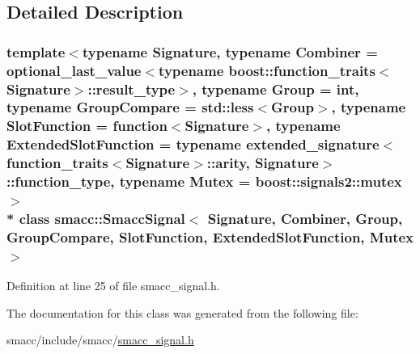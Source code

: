 \subsection{Detailed Description}
\subsubsection*{template$<$typename Signature, typename Combiner = optional\+\_\+last\+\_\+value$<$typename boost\+::function\+\_\+traits$<$\+Signature$>$\+::result\+\_\+type$>$, typename Group = int, typename Group\+Compare = std\+::less$<$\+Group$>$, typename Slot\+Function = function$<$\+Signature$>$, typename Extended\+Slot\+Function = typename extended\+\_\+signature$<$function\+\_\+traits$<$\+Signature$>$\+::arity, Signature$>$\+::function\+\_\+type, typename Mutex = boost\+::signals2\+::mutex$>$\\*
class smacc\+::\+Smacc\+Signal$<$ Signature, Combiner, Group, Group\+Compare, Slot\+Function, Extended\+Slot\+Function, Mutex $>$}



Definition at line 25 of file smacc\+\_\+signal.\+h.



The documentation for this class was generated from the following file\+:\begin{DoxyCompactItemize}
\item 
smacc/include/smacc/\hyperlink{smacc__signal_8h}{smacc\+\_\+signal.\+h}\end{DoxyCompactItemize}
